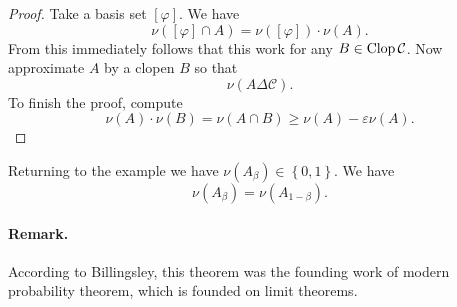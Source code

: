 \begin{proof}
Take a basis set \( \left[ \varphi \right] \). We have
\[ 
    \nu \left( \left[ \varphi \right] \cap A \right) = \nu \left( \left[ \varphi \right] \right) \cdot \nu(A).
\]
From this immediately follows that this work for any \( B \in \operatorname{Clop} \mathcal{C} \).
Now approximate \( A \) by a clopen \( B \) so that
\[ 
    \nu \left( A \Delta \mathcal{C} \right).
\]
To finish the proof, compute
\[ 
    \nu(A) \cdot \nu(B) = \nu( A \cap B ) \geqslant \nu(A) -\varepsilon\nu(A). 
\]
\end{proof}

Returning to the example we have \( \nu(A_\beta) \in \left\{ 0,1 \right\} \). We have
\[ 
    \nu(A_\beta) = \nu (A_{1-\beta}).
\]


\paragraph{Remark.} According to Billingsley, this theorem was the founding work of modern probability theorem, which is founded on limit theorems.
